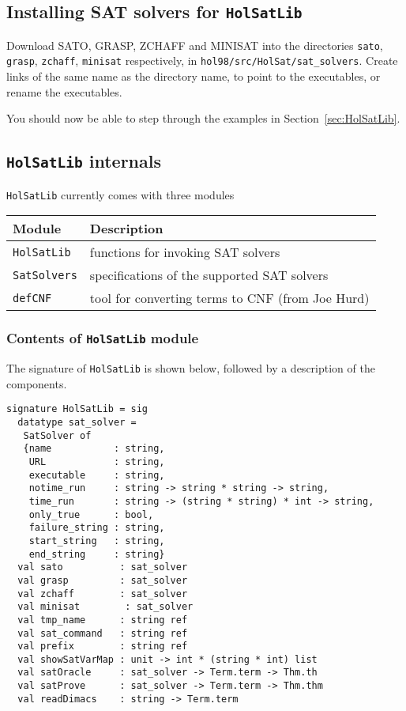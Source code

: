 \subsection{Installing SAT solvers for {\tt HolSatLib}}\label{install}

Download SATO, GRASP, ZCHAFF and MINISAT into the directories {\tt sato}, {\tt grasp},
{\tt zchaff}, {\tt minisat} respectively, in {\tt hol98/src/HolSat/sat\_solvers}. Create links of the same name as the directory name, to point to the executables, or rename the executables.

You should now be able to step through the examples in Section~\ref{sec:HolSatLib}.

\subsection{{\tt HolSatLib} internals}

{\tt HolSatLib} currently comes with three modules

\medskip

\begin{tabular}{ll}
{\bf Module} & {\bf Description} \\ \hline
{\tt HolSatLib} & functions for invoking SAT solvers\\
{\tt SatSolvers} & specifications of the supported SAT solvers\\
{\tt defCNF} & tool for converting \HOL{} terms to CNF (from Joe Hurd)
\end{tabular}

\medskip

\subsubsection{Contents of {\tt HolSatLib} module}

The signature of {\tt HolSatLib} is shown below, followed
by a description of the components.

{\small\begin{verbatim}
signature HolSatLib = sig
  datatype sat_solver = 
   SatSolver of 
   {name           : string,
    URL            : string,
    executable     : string,    
    notime_run     : string -> string * string -> string,    
    time_run       : string -> (string * string) * int -> string,      
    only_true      : bool,
    failure_string : string,
    start_string   : string,  
    end_string     : string}
  val sato          : sat_solver
  val grasp         : sat_solver
  val zchaff        : sat_solver
  val minisat        : sat_solver
  val tmp_name      : string ref
  val sat_command   : string ref
  val prefix        : string ref
  val showSatVarMap : unit -> int * (string * int) list
  val satOracle     : sat_solver -> Term.term -> Thm.th
  val satProve      : sat_solver -> Term.term -> Thm.thm
  val readDimacs    : string -> Term.term
\end{verbatim}}

